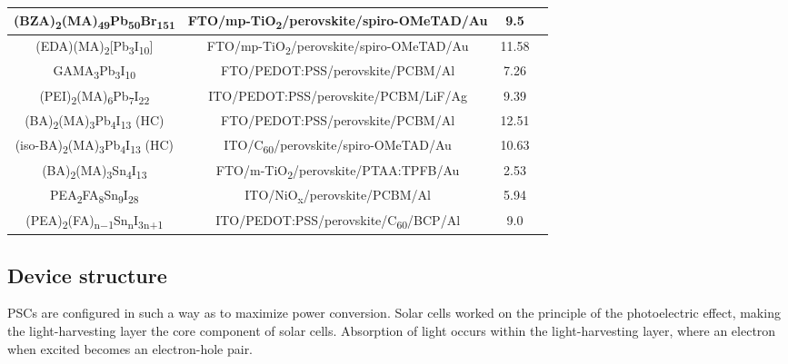\begin{table}[htb]
\begin{adjustbox}{max width=1\textwidth,center}
\begin{tabular}{c c c c}
    (BZA)\textsubscript{2}(MA)\textsubscript{49}Pb\textsubscript{50}Br\textsubscript{151}       & FTO/mp-TiO\textsubscript{2}/perovskite/spiro-OMeTAD/Au & 9.5   & {\cite{cohen_high_2017} \\ \hline
    (EDA)(MA)\textsubscript{2}{[Pb\textsubscript{3}I\textsubscript{10}]}      & FTO/mp-TiO\textsubscript{2}/perovskite/spiro-OMeTAD/Au & 11.58 & {\cite{jiang_new_2016} \\ \hline
    GAMA\textsubscript{3}Pb\textsubscript{3}I\textsubscript{10}                 & FTO/PEDOT:PSS/perovskite/PCBM/Al       & 7.26  & {\cite{soe_new_2017}} \\ \hline
    (PEI)\textsubscript{2}(MA)\textsubscript{6}Pb\textsubscript{7}I\textsubscript{22}           & ITO/PEDOT:PSS/perovskite/PCBM/LiF/Ag   & 9.39  & {\cite{yao_multilayered_2016}} \\ \hline
    (BA)\textsubscript{2}(MA)\textsubscript{3}Pb\textsubscript{4}I\textsubscript{13}   (HC)     & FTO/PEDOT:PSS/perovskite/PCBM/Al       & 12.51 & {\cite{tsai_high-efficiency_2016}} \\ \hline
    (iso-BA)\textsubscript{2}(MA)\textsubscript{3}Pb\textsubscript{4}I\textsubscript{13}   (HC) & ITO/C\textsubscript{60}/perovskite/spiro-OMeTAD/Au     & 10.63 & {\cite{chen_tailoring_2017}} \\ \hline
    (BA)\textsubscript{2}(MA)\textsubscript{3}Sn\textsubscript{4}I\textsubscript{13}            & FTO/m-TiO\textsubscript{2}/perovskite/PTAA:TPFB/Au      & 2.53  & {\cite{cao_thin_2017}} \\ \hline
    PEA\textsubscript{2}FA\textsubscript{8}Sn\textsubscript{9}I\textsubscript{28}               & ITO/NiO\textsubscript{x}/perovskite/PCBM/Al            & 5.94  & {\cite{liao_highly_2017}} \\ \hline
    (PEA)\textsubscript{2}(FA)\textsubscript{n−1}Sn\textsubscript{n}I\textsubscript{3n+1}       & ITO/PEDOT:PSS/perovskite/C\textsubscript{60}/BCP/Al    & 9.0   & {\cite{shao_highly_2018}} \\ \hline
\end{tabular}
\end{adjustbox}
\end{table}
\par \subsection{Device structure}
PSCs are configured in such a way as to maximize power conversion. Solar cells worked on the principle of the photoelectric effect, making the light-harvesting layer the core component of solar cells. Absorption of light occurs within the light-harvesting layer, where an electron when excited becomes an electron-hole pair.
